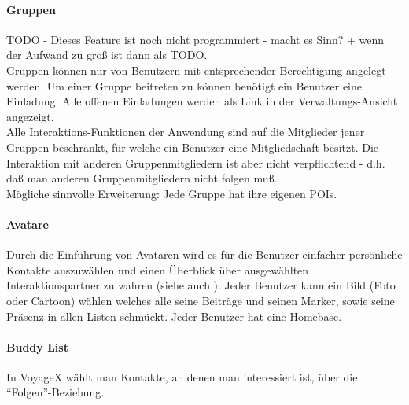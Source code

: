 \paragraph{Gruppen}
TODO - Dieses Feature ist noch nicht programmiert - macht es Sinn? + wenn der Aufwand zu groß ist dann als TODO.\\
Gruppen können nur von Benutzern mit entsprechender Berechtigung angelegt werden. Um einer Gruppe beitreten zu können
benötigt ein Benutzer eine Einladung. Alle offenen Einladungen werden als Link in der Verwaltungs-Ansicht angezeigt.\\
Alle Interaktions-Funktionen der Anwendung sind auf die Mitglieder jener Gruppen beschränkt, für welche ein Benutzer eine Mitgliedschaft besitzt. Die Interaktion mit anderen Gruppenmitgliedern ist aber nicht verpflichtend - d.h. daß man anderen Gruppenmitgliedern nicht folgen muß.\\
Mögliche sinnvolle Erweiterung: Jede Gruppe hat ihre eigenen POIs.

\paragraph{Avatare}
Durch die Einführung von Avataren wird es für die Benutzer einfacher persönliche Kontakte auszuwählen und einen Überblick über ausgewählten Interaktionspartner zu wahren (siehe auch \cite[S. 97ff.]{SCLU:PFCMI}). Jeder Benutzer kann ein Bild (Foto oder Cartoon) wählen welches alle seine Beiträge und seinen Marker, sowie seine Präsenz in allen Listen schmückt. Jeder Benutzer hat eine Homebase.

\paragraph{Buddy List}
In VoyageX wählt man Kontakte, an denen man interessiert ist, über die "`Folgen"'-Beziehung.


